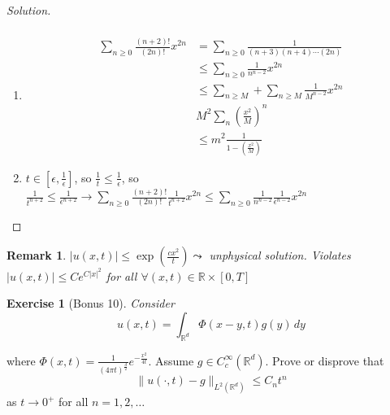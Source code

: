 \documentclass{report}
\theoremstyle{tommy}
\newtheorem{rem}[defn]{Remark}
\newtheorem{ex}[defn]{Exercise}
\begin{document}
\begin{proof}[Solution]
\begin{align*}
    \end{align*}
    \begin{enumerate}[label=(\arabic*)]
      \item \begin{align*}
        \sum_{n \ge 0} \frac{(n+2)!}{(2n)!}x^{2n} &= \sum_{n \ge 0} \frac{1}{(n+3)(n+4)\cdots(2n)} \\
        &\le \sum_{n \ge 0} \frac{1}{n^{n-2}} x^{2n} \\
        &\le \sum_{n \ge M} + \sum_{n \ge M} \frac{1}{M^{n-2}} x^{2n} \\
        &M^2 \sum_n {\left(\frac{x^2}{M}\right)^n} \\
        &\le m^2 \frac{1}{1 - \left(\frac{x^2}{M}\right)}
      \end{align*}
      \item \(t \in [\epsilon, \frac{1}{\epsilon}]\), so \(\frac{1}{t} \le \frac{1}{\epsilon}\), so 
      \(\frac{1}{t^{n+2}} \le \frac{1}{\epsilon^{n+2}} \longrightarrow \sum_{n \ge 0} \frac{(n+2)!}{(2n)!} \frac{1}{t^{n+2}} x^{2n} \le \sum_{n \ge 0} \frac{1}{n^{n-2}} \frac{1}{\epsilon^{n-2}} x^{2n}\)
    \end{enumerate}
  \end{proof}

  \begin{rem}
    \(|u(x,t)| \le \exp \left(\frac{cx^2}{t}\right) \leadsto \) unphysical solution. Violates \(|u(x,t)| \le Ce^{C|x|^2}\) for all \(\forall (x,t) \in \mathbb{R} \times [0,T]\)
  \end{rem}

  \begin{ex}[Bonus 10]
    Consider 
    \[u(x,t) = \int_{\mathbb{R}^d} \Phi(x-y,t) g(y) \, dy\]
  \end{ex}
  where \(\Phi(x,t) = \frac{1}{(4 \pi t)^{\frac{d}{2}}}e^{-\frac{x^2}{4t}}\). Assume \(g \in C_c^\infty(\mathbb{R}^d)\). Prove or disprove that 
  \[\|u(\cdot, t)-g\|_{L^2(\mathbb{R}^d)} \le C_nt^n\]
  as \(t \to 0^+\) for all \(n = 1,2,\dots\)
\end{document}
